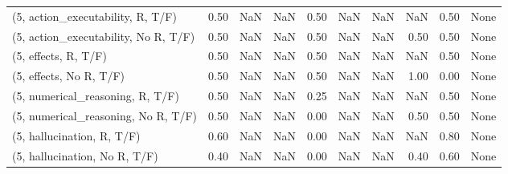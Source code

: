 \begin{table*}[h!]
\begin{adjustbox}{width=2\columnwidth,center}
\begin{tabular}{lrrr|rrr|rrr}
(5, action\_executability, R, T/F)    &                      0.50 &                   NaN &                       NaN &                          0.50 &                       NaN &                           NaN &                                    NaN &                               0.50 &                                  None \\
(5, action\_executability, No R, T/F) &                      0.50 &                   NaN &                       NaN &                          0.50 &                       NaN &                           NaN &                                   0.50 &                               0.50 &                                  None \\
(5, effects, R, T/F)                 &                      0.50 &                   NaN &                       NaN &                          0.50 &                       NaN &                           NaN &                                    NaN &                               0.50 &                                  None \\
(5, effects, No R, T/F)              &                      0.50 &                   NaN &                       NaN &                          0.50 &                       NaN &                           NaN &                                   1.00 &                               0.00 &                                  None \\
(5, numerical\_reasoning, R, T/F)     &                      0.50 &                   NaN &                       NaN &                          0.25 &                       NaN &                           NaN &                                    NaN &                               0.50 &                                  None \\
(5, numerical\_reasoning, No R, T/F)  &                      0.50 &                   NaN &                       NaN &                          0.00 &                       NaN &                           NaN &                                   0.50 &                               0.50 &                                  None \\
(5, hallucination, R, T/F)           &                      0.60 &                   NaN &                       NaN &                          0.00 &                       NaN &                           NaN &                                    NaN &                               0.80 &                                  None \\
(5, hallucination, No R, T/F)        &                      0.40 &                   NaN &                       NaN &                          0.00 &                       NaN &                           NaN &                                   0.40 &                               0.60 &                                  None \\

\end{tabular}
\end{adjustbox}
\end{table*}
